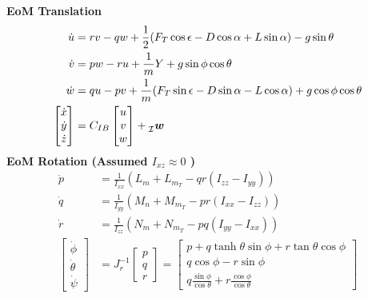 \documentclass[a4paper, 8pt]{extarticle}
\newcommand{\mvec}[3]{  \prescript{}{\mathcal{#1}}{\bm{#2}}  _{#3} }
\begin{document}
\begin{multicols*}{3}
\textbf{EoM Translation}
{\scriptsize
\begin{align*}
    \dot{u} &= rv-qw+\frac{1}{2}(F_{T}\cos{\epsilon}-D\cos{\alpha}+L\sin{\alpha})-g\sin{\theta}\\
    \dot{v} &=pw-ru+\frac{1}{m}Y+g\sin{\phi}\cos{\theta}\\
    \dot{w} &=qu-pv+\frac{1}{m}(F_{T}\sin{\epsilon}-D\sin{\alpha}-L\cos{\alpha})+g\cos{\phi}\cos{\theta}\\
    \begin{bmatrix} \dot{x} \\ \dot{y} \\ \dot{z} \end{bmatrix} &= C_{IB}\begin{bmatrix}
    u\\v\\w \end{bmatrix}+\mvec{\mathcal{I}}{w}{}
\end{align*}
}
\textbf{EoM Rotation (Assumed $I_{xz} \approx 0$ )}
\begin{align*}
    \dot{p} &= \frac{1}{I_{xx}}(L_{m}+L_{m_{T}}-qr(I_{zz}-I_{yy}))\\
    \dot{q} &= \frac{1}{I_{yy}}(M_{n}+M_{m_{T}}-pr(I_{xx}-I_{zz}))\\
    \dot{r} &= \frac{1}{I_{zz}}(N_{m}+N_{m_{T}}-pq(I_{yy}-I_{xx}))\\
    \begin{bmatrix} \dot{\phi} \\ \dot{\theta} \\ \dot{\psi}
    \end{bmatrix} &= J_{r}^{-1}\begin{bmatrix}
    p \\ q \\ r
    \end{bmatrix} = \begin{bmatrix}
    p+q\tanh{\theta}\sin{\phi}+r\tan{\theta}\cos{\phi}\\
    q\cos{\phi}-r\sin{\phi}\\
    q\frac{\sin{\phi}}{\cos{\theta}}+r\frac{\cos{\phi}}{\cos{\theta}}
    \end{bmatrix}
\end{align*}


\end{multicols*}
\end{document}
